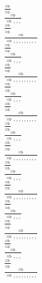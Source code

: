 \documentclass[11pt]{article}
\begin{document}
\begin{center}
\bigskip
\\$\frac{\Rightarrow }{\Rightarrow }$
\bigskip
\\$\frac{\Rightarrow }{\Rightarrow , , , }$
\bigskip
\\$\frac{\Rightarrow }{\Rightarrow }$
\bigskip
\\$\frac{\Rightarrow }{\Rightarrow , , , , , , , , , }$
\bigskip
\\$\frac{\Rightarrow }{\Rightarrow }$
\bigskip
\\$\frac{\Rightarrow }{\Rightarrow , , , }$
\bigskip
\\$\frac{\Rightarrow }{\Rightarrow }$
\bigskip
\\$\frac{\Rightarrow }{\Rightarrow , , , , , , , , , }$
\bigskip
\\$\frac{\Rightarrow }{\Rightarrow }$
\bigskip
\\$\frac{\Rightarrow }{\Rightarrow , , , }$
\bigskip
\\$\frac{\Rightarrow }{\Rightarrow }$
\bigskip
\\$\frac{\Rightarrow }{\Rightarrow , , , , , , , , , }$
\bigskip
\\$\frac{\Rightarrow }{\Rightarrow }$
\bigskip
\\$\frac{\Rightarrow }{\Rightarrow , , , }$
\bigskip
\\$\frac{\Rightarrow }{\Rightarrow }$
\bigskip
\\$\frac{\Rightarrow }{\Rightarrow , , , , , , , , , }$
\bigskip
\\$\frac{\Rightarrow }{\Rightarrow }$
\bigskip
\\$\frac{\Rightarrow }{\Rightarrow , , , }$
\bigskip
\\$\frac{\Rightarrow }{\Rightarrow }$
\bigskip
\\$\frac{\Rightarrow }{\Rightarrow , , , , , , , , , }$
\bigskip
\\$\frac{\Rightarrow }{\Rightarrow }$
\bigskip
\\$\frac{\Rightarrow }{\Rightarrow , , , }$
\bigskip
\\$\frac{\Rightarrow }{\Rightarrow }$
\bigskip
\\$\frac{\Rightarrow }{\Rightarrow , , , , , , , , , }$
\bigskip
\\$\frac{\Rightarrow }{\Rightarrow }$
\bigskip
\\$\frac{\Rightarrow }{\Rightarrow , , , }$
\bigskip
\\$\frac{\Rightarrow }{\Rightarrow }$
\bigskip
\\$\frac{\Rightarrow }{\Rightarrow , , , , , , , , , }$

\end{center}
\end{document}
